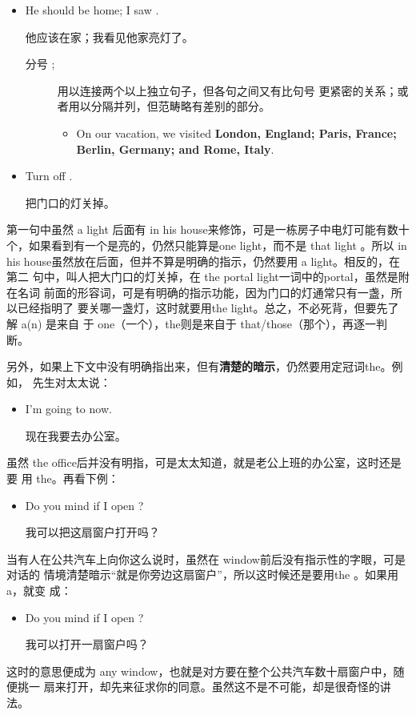 \begin{itemize}
\item  He should be home; I saw .

他应该在家；我看见他家亮灯了。

\begin{description}
\item[分号 ;]  用以连接两个以上独立句子，但各句之间又有比句号
  更紧密的关系；或者用以分隔并列，但范畴略有差别的部分。
  \begin{itemize}
  \item On our vacation, we visited \textbf{London, England; Paris, France;
      Berlin, Germany; and Rome, Italy}.
  \end{itemize}

\end{description}

\item  Turn off .

把门口的灯关掉。
\end{itemize}

第一句中虽然 a light 后面有 in his house来修饰，可是一栋房子中电灯可能有数十
个，如果看到有一个是亮的，仍然只能算是one light，而不是 that light 。所以 in
his house虽然放在后面，但并不算是明确的指示，仍然要用 a light。相反的，在第二
句中，叫人把大门口的灯关掉，在 the portal light一词中的portal，虽然是附在名词
前面的形容词，可是有明确的指示功能，因为门口的灯通常只有一盏，所以已经指明了
要关哪一盏灯，这时就要用the light。总之，不必死背，但要先了解 a(n) 是来自
于 one（一个），the则是来自于 that/those（那个），再逐一判断。

另外，如果上下文中没有明确指出来，但有\textbf{清楚的暗示}，仍然要用定冠词the。例如，
先生对太太说：
\begin{itemize}
\item  I'm going to  now.

  现在我要去办公室。
\end{itemize}

虽然 the office后并没有明指，可是太太知道，就是老公上班的办公室，这时还是要
用 the。再看下例：
\begin{itemize}
\item  Do you mind if I open ?

  我可以把这扇窗户打开吗？
\end{itemize}

当有人在公共汽车上向你这么说时，虽然在 window前后没有指示性的字眼，可是对话的
情境清楚暗示“就是你旁边这扇窗户”，所以这时候还是要用the 。如果用 a，就变
成：
\begin{itemize}
\item  Do you mind if I open ?

  我可以打开一扇窗户吗？
\end{itemize}
这时的意思便成为 any window，也就是对方要在整个公共汽车数十扇窗户中，随便挑一
扇来打开，却先来征求你的同意。虽然这不是不可能，却是很奇怪的讲法。

